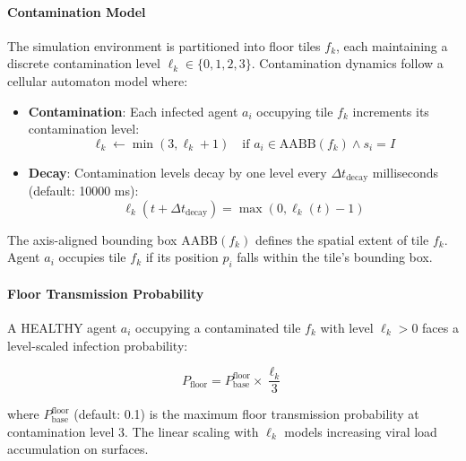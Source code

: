 \paragraph{Contamination Model}

The simulation environment is partitioned into floor tiles $f_k$, each maintaining a discrete contamination level $\ell_k \in \{0, 1, 2, 3\}$. Contamination dynamics follow a cellular automaton model where:

\begin{itemize}
    \item \textbf{Contamination}: Each infected agent $a_i$ occupying tile $f_k$ increments its contamination level:
    \begin{equation}
    \label{eq:contaminate-tile}
    \ell_k \leftarrow \min(3, \ell_k + 1) \quad \text{if } a_i \in \text{AABB}(f_k) \land s_i = I
    \end{equation}
    
    \item \textbf{Decay}: Contamination levels decay by one level every $\Delta t_{\text{decay}}$ milliseconds (default: 10000 ms):
    \begin{equation}
    \label{eq:decay-tile}
    \ell_k(t + \Delta t_{\text{decay}}) = \max(0, \ell_k(t) - 1)
    \end{equation}
\end{itemize}

The axis-aligned bounding box $\text{AABB}(f_k)$ defines the spatial extent of tile $f_k$. Agent $a_i$ occupies tile $f_k$ if its position $p_i$ falls within the tile's bounding box.

\paragraph{Floor Transmission Probability}

A HEALTHY agent $a_i$ occupying a contaminated tile $f_k$ with level $\ell_k > 0$ faces a level-scaled infection probability:

\begin{equation}
\label{eq:floor-prob-level}
P_{\text{floor}} = P_{\text{base}}^{\text{floor}} \times \frac{\ell_k}{3}
\end{equation}

where $P_{\text{base}}^{\text{floor}}$ (default: 0.1) is the maximum floor transmission probability at contamination level 3. The linear scaling with $\ell_k$ models increasing viral load accumulation on surfaces.


